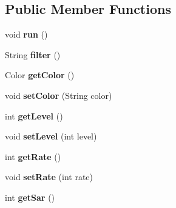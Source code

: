 \subsection*{Public Member Functions}
\begin{DoxyCompactItemize}
\item 
\hypertarget{classjson__objects_1_1tools_1_1_nullsrc_a570edd9e08279301c4fe2af02f643a38}{
void {\bfseries run} ()}
\label{classjson__objects_1_1tools_1_1_nullsrc_a570edd9e08279301c4fe2af02f643a38}

\item 
\hypertarget{classjson__objects_1_1tools_1_1_nullsrc_a1fa827d96ee53fc9689335b00410b911}{
String {\bfseries filter} ()}
\label{classjson__objects_1_1tools_1_1_nullsrc_a1fa827d96ee53fc9689335b00410b911}

\item 
\hypertarget{classjson__objects_1_1tools_1_1_nullsrc_aa88e88fe82e43686911ca5955552dda2}{
Color {\bfseries getColor} ()}
\label{classjson__objects_1_1tools_1_1_nullsrc_aa88e88fe82e43686911ca5955552dda2}

\item 
\hypertarget{classjson__objects_1_1tools_1_1_nullsrc_a6c8f74d5e5398de023f8378b084d5ee1}{
void {\bfseries setColor} (String color)}
\label{classjson__objects_1_1tools_1_1_nullsrc_a6c8f74d5e5398de023f8378b084d5ee1}

\item 
\hypertarget{classjson__objects_1_1tools_1_1_nullsrc_a96f4de565847ebf3638f76bf25c867d6}{
int {\bfseries getLevel} ()}
\label{classjson__objects_1_1tools_1_1_nullsrc_a96f4de565847ebf3638f76bf25c867d6}

\item 
\hypertarget{classjson__objects_1_1tools_1_1_nullsrc_a2e12a3bc3a71e59c66cd214d7304c367}{
void {\bfseries setLevel} (int level)}
\label{classjson__objects_1_1tools_1_1_nullsrc_a2e12a3bc3a71e59c66cd214d7304c367}

\item 
\hypertarget{classjson__objects_1_1tools_1_1_nullsrc_a44a650d3b8adcb8e5b7fac395e22e42c}{
int {\bfseries getRate} ()}
\label{classjson__objects_1_1tools_1_1_nullsrc_a44a650d3b8adcb8e5b7fac395e22e42c}

\item 
\hypertarget{classjson__objects_1_1tools_1_1_nullsrc_ab799a1c5f36c22e2db9b139ce78fad1e}{
void {\bfseries setRate} (int rate)}
\label{classjson__objects_1_1tools_1_1_nullsrc_ab799a1c5f36c22e2db9b139ce78fad1e}

\item 
\hypertarget{classjson__objects_1_1tools_1_1_nullsrc_ad162de23b3ab530bfd499bf94b435e40}{
int {\bfseries getSar} ()}
\label{classjson__objects_1_1tools_1_1_nullsrc_ad162de23b3ab530bfd499bf94b435e40}


\end{DoxyCompactItemize}
